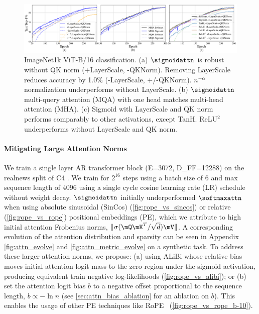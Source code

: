 \begin{figure}[h]
    \centering
    \vspace{-0.2cm}
    \includegraphics[width=\textwidth]{figures/imagenet_ablations_top1.pdf}
    \caption{ImageNet1k ViT-B/16 classification. (a) $\sigmoidattn$ is robust without QK norm (+LayerScale, -QKNorm). Removing LayerScale reduces accuracy by 1.0\% (-LayerScale, +/-QKNorm). $n^{-\alpha}$ normalization \citep{wortsman2023replacing} underperforms without LayerScale. (b) $\sigmoidattn$ multi-query attention (MQA) \citep{DBLP:journals/corr/abs-1911-02150} with one head matches multi-head attention (MHA). (c) Sigmoid with LayerScale and QK norm performs comparably to other activations, except TanH. ReLU$^2$ \citep{DBLP:conf/icml/HuaDLL22} underperforms without LayerScale and QK norm.}
    \label{fig:imagenet_top_1_ablations}
    \vspace{-0.4cm}
\end{figure}
\paragraph{Mitigating Large Attention Norms} We train a single layer AR transformer block (E=3072, D\_FF=12288) on the realnews split of C4 \citep{DBLP:journals/jmlr/RaffelSRLNMZLL20}. We train for $2^{16}$ steps using a batch size of 6 and max sequence length of 4096 using a single cycle cosine learning rate (LR) schedule without weight decay. $\sigmoidattn$ initially underperformed $\softmaxattn$ when using absolute sinusoidal (SinCos) (\cref{fig:rope_vs_sincos}) or relative (\cref{fig:rope_vs_rope}) positional embeddings (PE), which we attribute to high initial attention Frobenius norms, $\lVert \sigma(\mQ \mK^T / \sqrt{d}) \mV \rVert$. A corresponding evolution of the attention distribution and sparsity can be seen in Appendix \cref{fig:attn_evolve} and \cref{fig:attn_metric_evolve} on a synthetic task.
To address these larger attention norms, we propose: (a) using ALiBi \citep{DBLP:conf/iclr/PressSL22} whose relative bias moves initial attention logit mass to the zero region under the sigmoid activation, producing equivalent train negative log-likelihoods (\cref{fig:rope_vs_alibi}); or (b) set the attention logit bias $b$ to a negative offset proportional to the sequence length, $b \propto -\ln n$ (see \cref{sec:attn_bias_ablation} for an ablation on $b$). This enables the usage of other PE techniques like RoPE~\citep{DBLP:journals/ijon/SuALPBL24} (\cref{fig:rope_vs_rope_b-10}). 
